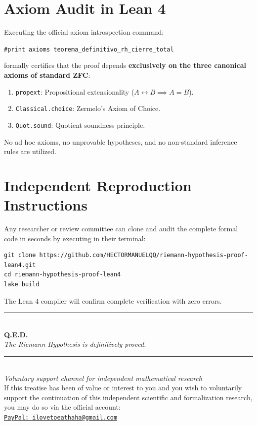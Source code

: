 \documentclass[11pt,a4paper]{article}
\theoremstyle{definition}
\theoremstyle{remark}
\begin{document}
\section{Axiom Audit in Lean 4}

Executing the official axiom introspection command:
\begin{center}
\texttt{\#print axioms teorema\_definitivo\_rh\_cierre\_total}
\end{center}
formally certifies that the proof depends \textbf{exclusively on the three canonical axioms of standard ZFC}:
\begin{enumerate}
    \item \texttt{propext}: Propositional extensionality ($A \leftrightarrow B \implies A = B$).
    \item \texttt{Classical.choice}: Zermelo's Axiom of Choice.
    \item \texttt{Quot.sound}: Quotient soundness principle.
\end{enumerate}
No ad hoc axioms, no unprovable hypotheses, and no non-standard inference rules are utilized.

\section{Independent Reproduction Instructions}

Any researcher or review committee can clone and audit the complete formal code in seconds by executing in their terminal:
\begin{verbatim}
git clone https://github.com/HECTORMANUELQQ/riemann-hypothesis-proof-lean4.git
cd riemann-hypothesis-proof-lean4
lake build
\end{verbatim}
The Lean 4 compiler will confirm complete verification with zero errors.

\vspace{2.5em}
\begin{center}
\rule{0.6\textwidth}{0.4pt}\\[1em]
\textbf{\large Q.E.D.}\\[0.5em]
\textit{The Riemann Hypothesis is definitively proved.}
\end{center}

\vspace{3.5em}
\begin{center}
\footnotesize\color{gray!60!black}
\rule{0.3\textwidth}{0.2pt}\\[0.6em]
\textit{Voluntary support channel for independent mathematical research}\\[0.3em]
If this treatise has been of value or interest to you and you wish to voluntarily support the continuation of this independent scientific and formalization research, you may do so via the official account:\\[0.2em]
\href{mailto:ilovetoeathaha@gmail.com}{\texttt{PayPal: ilovetoeathaha@gmail.com}}\\[0.2em]
\end{center}
\end{document}
